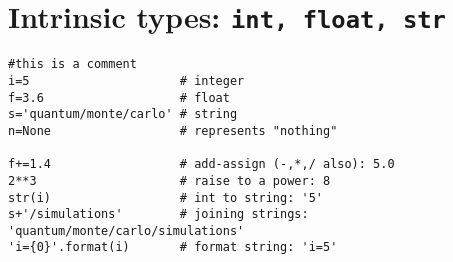 \documentclass[oneside,11pt]{memoir}
\numberwithin{equation}{section}
\begin{document}
\section{Intrinsic types: \texttt{int, float, str}}
\begin{shaded}
\begin{verbatim}
#this is a comment
i=5                     # integer
f=3.6                   # float
s='quantum/monte/carlo' # string
n=None                  # represents "nothing"

f+=1.4                  # add-assign (-,*,/ also): 5.0
2**3                    # raise to a power: 8
str(i)                  # int to string: '5'
s+'/simulations'        # joining strings: 'quantum/monte/carlo/simulations'
'i={0}'.format(i)       # format string: 'i=5'

\end{verbatim}
\end{shaded}

 
\end{document}
